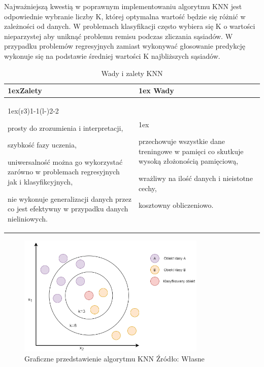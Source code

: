 Najważniejszą kwestią w poprawnym implementowaniu algorytmu KNN jest odpowiednie wybranie liczby
K, której optymalna wartość będzie się różnić w zależności od danych. W problemach 
klasyfikacji często wybiera się K o wartości nieparzystej aby uniknąć problemu remisu
podczas zliczania sąsiadów. W przypadku problemów regresyjnych zamiast wykonywać głosowanie
predykcję wykonuje się na podstawie średniej wartości K najbliższych sąsiadów.

\begin{table}[h]
    \begin{tabularx}{\linewidth}{>{\parskip1ex}X@{\kern4\tabcolsep}>{\parskip1ex}X}
    \toprule
    \hfil\bfseries Zalety
    &
    \hfil\bfseries Wady
    \\\cmidrule(r{3\tabcolsep}){1-1}\cmidrule(l{-\tabcolsep}){2-2}
    
    prosty do zrozumienia i interpretacji,\par
    szybkość fazy uczenia,\par
    uniwersalność można go wykorzystać zarówno w problemach regresyjnych jak i klasyfikcyjnych,\par
    nie wykonuje generalizacji danych przez co jest efektywny w przypadku danych nieliniowych.\par
    &
    
    przechowuje wszystkie dane treningowe w pamięci co skutkuje wysoką złożonością pamięciową,\par
    wrażliwy na ilość danych i nieistotne cechy,\par
    kosztowny obliczeniowo.\par
    \\\bottomrule
    \end{tabularx}
    \caption{Wady i zalety KNN}
\end{table}
    

\begin{figure}[h]
    \centering
    \includegraphics[width=0.8\textwidth]{./Img/KNN.png}
    \caption{Graficzne przedstawienie algorytmu KNN Źródło: Własne}
\end{figure}

